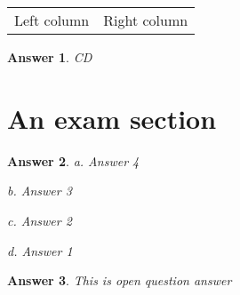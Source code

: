 \documentclass[12pt,a4paper,notitlepage]{article}
\newtheorem{answer}{Answer}
\begin{document}
    \begin{tabular}{*{2}{>{\centering\let\newline\\\arraybackslash\hspace{0pt} }m{}}}
        Left column & Right column
    \end{tabular}

    \begin{answer}
        CD
    \end{answer}

    \section{An exam section}

    \begin{answer}
        a. Answer 4

    b. Answer 3

    c. Answer 2

    d. Answer 1
    \end{answer}

    \begin{answer}
        This is open question answer
    \end{answer}
\end{document}
